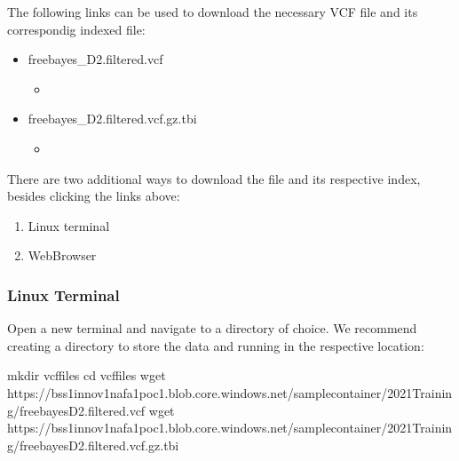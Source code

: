 \documentclass[letterpaper,10pt,english]{sphinxhowto}
\begin{document}
\sphinxAtStartPar
The following links can be used to download the necessary VCF file and its correspondig indexed  file:
\begin{itemize}
\item {} 
\sphinxAtStartPar
freebayes\_D2.filtered.vcf
\begin{itemize}
\item {} 
\sphinxAtStartPar
{}

\end{itemize}

\item {} 
\sphinxAtStartPar
freebayes\_D2.filtered.vcf.gz.tbi
\begin{itemize}
\item {} 
\sphinxAtStartPar
{}

\end{itemize}

\end{itemize}

\sphinxAtStartPar
There are two additional ways to download the  file and its respective index, besides clicking the links above:
\begin{enumerate}
%
\item {} 
\sphinxAtStartPar
Linux terminal

\item {} 
\sphinxAtStartPar
Web\sphinxhyphen{}Browser

\end{enumerate}


\subsubsection{Linux Terminal}
\label{\detokenize{index:linux-terminal}}
\sphinxAtStartPar
Open a new terminal and navigate to a directory of choice. We recommend creating a directory to store the data and running  in the respective location:

\begin{sphinxVerbatim}[commandchars=\\\{\}]
\PYGZdl{} mkdir vcf\PYGZus{}files
\PYGZdl{} cd vcf\PYGZus{}files
\PYGZdl{} wget https://bss1innov1nafa1poc1.blob.core.windows.net/sample\PYGZhy{}container/2021\PYGZus{}Training/freebayes\PYGZus{}D2.filtered.vcf
\PYGZdl{} wget https://bss1innov1nafa1poc1.blob.core.windows.net/sample\PYGZhy{}container/2021\PYGZus{}Training/freebayes\PYGZus{}D2.filtered.vcf.gz.tbi
\end{sphinxVerbatim}
\end{document}
